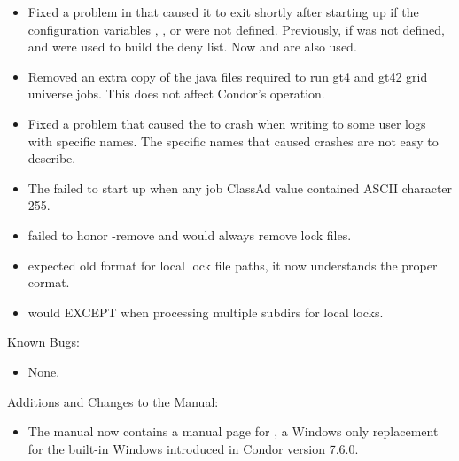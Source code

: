 \begin{itemize}
\item Fixed a problem in  that caused it to exit shortly
after starting up if the configuration variables 
, , or  
were not defined.
Previously, if  was
not defined,  and 
were used to build the deny list.  
Now  and  are also used.

\item Removed an extra copy of the java files required to run gt4 and gt42
grid universe jobs. This does not affect Condor's operation.

\item Fixed a problem that caused the  to crash when
writing to some user logs with specific names.  The specific names that
caused crashes are not easy to describe.

\item The  failed to start up when any job ClassAd
value contained ASCII character 255.

\item {} failed to honor -remove and would always remove
  lock files.

\item {} expected old format for local lock file paths, it
  now understands the proper cormat.

\item {} would EXCEPT when processing multiple subdirs for
  local locks.

\end{itemize}

\noindent Known Bugs:

\begin{itemize}

\item None.

\end{itemize}

\noindent Additions and Changes to the Manual:

\begin{itemize}

\item The manual now contains a manual page for ,
a Windows only replacement for the built-in Windows 
introduced in Condor version 7.6.0.

\end{itemize}


